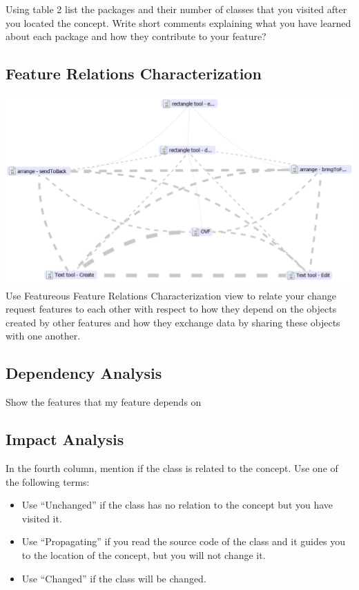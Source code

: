 Using table 2 list the packages and their number of classes that you visited after you located the concept. Write short comments explaining what you have learned about each package and how they contribute to your feature?
\subsection{Feature Relations Characterization}
\includegraphics[width=\textwidth]{Images/featureousrelations.png}
Use Featureous Feature Relations Characterization view to relate your change request features to each other with respect to how they depend on the objects created by other features and how they exchange data by sharing these objects with one another.
\subsection{Dependency Analysis}

Show the features that my feature depends on

\subsection{Impact Analysis}
In the fourth column, mention if the class is related to the concept. Use one of the following terms:
\begin{itemize}
    \item Use “Unchanged” if the class has no relation to the concept but you have visited it.
    \item Use “Propagating” if you read the source code of the class and it guides you to the location of the concept, but you will not change it.
    \item Use “Changed” if the class will be changed.
\end{itemize}


